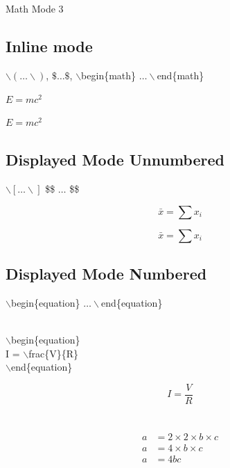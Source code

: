\documentclass{article}
\begin{document}
\section{ }
  Math Mode   3  

\subsection{Inline mode}
    $\backslash( \dots \backslash)$, $\$ \dots \$$,   $\backslash$begin\{math\} $\dots \backslash$end\{math\}  

   $E = mc^2$

   \( E = mc^2 \)

\subsection{Displayed Mode   Unnumbered}
      $\backslash[ \dots \backslash]$   \$\$ $\dots$ \$\$  

\code{$\backslash[$ $\backslash$bar\{x\} = $\backslash$sum x\_i $\backslash]$}  
\[ \bar{x} = \sum x_i \]

$$ \bar{x} = \sum x_i $$

\subsection{Displayed Mode   Numbered}
          $\backslash$begin\{equation\} $\dots \backslash$end\{equation\}

  \\
$\backslash$begin\{equation\} \\
I = $\backslash$frac\{V\}\{R\} \\
$\backslash$end\{equation\}

 
\begin{equation}
I = \frac{V}{R}
\end{equation}

\section{ }
     
\begin{equation}
\begin{aligned}
a & = 2 \times 2 \times b \times c \\
a & = 4 \times b \times c \\
a & = 4bc
\end{aligned}
\end{equation}
\end{document}
